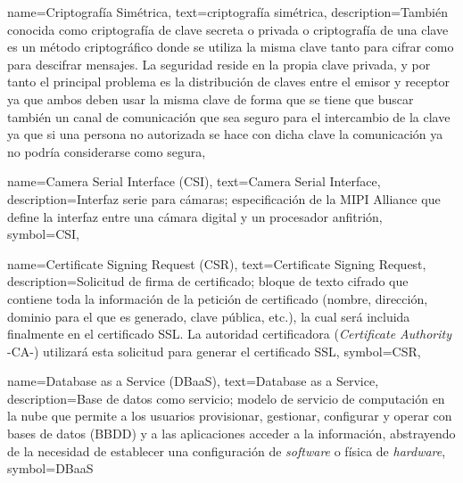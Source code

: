 {
    name={Criptografía Simétrica},
    text={criptografía simétrica},
    description={También conocida como criptografía de clave secreta o privada o criptografía de una clave es un método criptográfico donde se utiliza la misma clave tanto para cifrar como para descifrar mensajes. La seguridad reside en la propia clave privada, y por tanto el principal problema es la distribución de claves entre el emisor y receptor ya que ambos deben usar la misma clave de forma que se tiene que buscar también un canal de comunicación que sea seguro para el intercambio de la clave ya que si una persona no autorizada se hace con dicha clave la comunicación ya no podría considerarse como segura},
}

{
    name={Camera Serial Interface (CSI)},
    text={Camera Serial Interface},
    description={Interfaz serie para cámaras; especificación de la MIPI Alliance que define la interfaz entre una cámara digital y un procesador anfitrión},
    symbol={CSI},
}

{
    name={Certificate Signing Request (CSR)},
    text={Certificate Signing Request},
    description={Solicitud de firma de certificado; bloque de texto cifrado que contiene toda la información de la petición de certificado (nombre, dirección, dominio para el que es generado, clave pública, etc.), la cual será incluida finalmente en el certificado SSL. La autoridad certificadora (\textit{Certificate Authority} -CA-) utilizará esta solicitud para generar el certificado SSL},
    symbol={CSR},
}

{
    name={Database as a Service (DBaaS)},
    text={Database as a Service},
    description={Base de datos como servicio; modelo de servicio de computación en la nube que permite a los usuarios provisionar, gestionar, configurar y operar con bases de datos (BBDD) y a las aplicaciones acceder a la información, abstrayendo de la necesidad de establecer una configuración de \textit{software} o física de \textit{hardware}},
    symbol={DBaaS}
}

